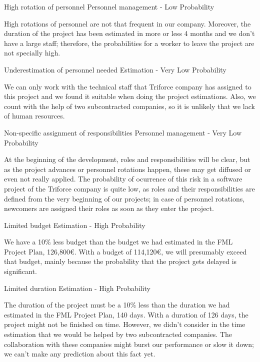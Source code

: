 \begin{risk}{High rotation of personnel}
\riskcat Personnel management
 - Low Probability 

High rotations of personnel are not that frequent in our company. Moreover, the duration of the project has been estimated in more or less 4 months and we don't have a large staff; therefore, the probabilities for a worker to leave the project are not specially high.
\end{risk}

\begin{risk}{Underestimation of personnel needed}
\riskcat Estimation
 - Very Low Probability 

We can only work with the technical staff that Triforce company has assigned to this project and we found it suitable when doing the project estimations. Also, we count with the help of two subcontracted companies, so it is unlikely that we lack of human resources.
\end{risk}

\begin{risk}{Non-specific assignment of responsibilities}
\riskcat Personnel management
 - Very Low Probability 

At the beginning of the development, roles and responsibilities will be clear, but as the project advances or personnel rotations happen, these may get diffused or even not really applied. The probability of ocurrence of this risk in a software project of the Triforce company is quite low, as roles and their responsibilities are defined from the very beginning of our projects; in case of personnel rotations, newcomers are assigned their roles as soon as they enter the project.
\end{risk}

\begin{risk}{Limited budget}
\riskcat Estimation
 - High Probability 

We have a 10\% less budget than the budget we had estimated in the FML Project Plan,  126,800\euro. With a budget of 114,120\euro, we will presumably exceed that budget, mainly because the probability that the project gets delayed is significant.
\end{risk}

\begin{risk}{Limited duration}
\riskcat Estimation
 - High Probability 

The duration of the project must be a 10\% less than the duration we had estimated in the FML Project Plan, 140 days. With a duration of 126 days, the project might not be finished on time. However, we didn't consider in the time estimation that we would be helped by two subcontracted companies. The collaboration with these companies might burst our performance or slow it down; we can't make any prediction about this fact yet.
\end{risk}



